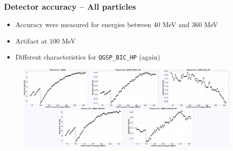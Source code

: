 \begin{frame}
\frametitle{Detector accuracy -- All particles}

\begin{block}{}
	\begin{itemize}
		\item Accuracy were measured for energies between $40$ MeV and $360$ MeV
		\item Artifact at $100$ MeV
		\item Different characteristics for \texttt{QGSP\_BIC\_HP} (again)
	\end{itemize}
\end{block}

\begin{figure}
	\includegraphics[width=\textwidth]{images/detection_rates.pdf}
\end{figure}


\end{frame}